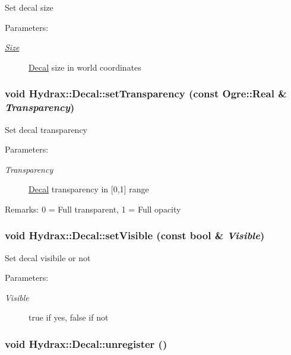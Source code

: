 Set decal size \begin{Desc}
\item[Parameters:]
\begin{description}
\item[{\em \hyperlink{struct_hydrax_1_1_size}{Size}}]\hyperlink{class_hydrax_1_1_decal}{Decal} size in world coordinates \end{description}
\end{Desc}
\hypertarget{class_hydrax_1_1_decal_c1f66263a33a56b806ea08fb05b47951}{
\subsubsection[{setTransparency}]{\setlength{\rightskip}{0pt plus 5cm}void Hydrax::Decal::setTransparency (const Ogre::Real \& {\em Transparency})}}
\label{class_hydrax_1_1_decal_c1f66263a33a56b806ea08fb05b47951}


Set decal transparency \begin{Desc}
\item[Parameters:]
\begin{description}
\item[{\em Transparency}]\hyperlink{class_hydrax_1_1_decal}{Decal} transparency in \mbox{[}0,1\mbox{]} range \end{description}
\end{Desc}
\begin{Desc}
\item[Remarks:]0 = Full transparent, 1 = Full opacity \end{Desc}
\hypertarget{class_hydrax_1_1_decal_5c51a36fc2d8c6f320db291805b8401a}{
\subsubsection[{setVisible}]{\setlength{\rightskip}{0pt plus 5cm}void Hydrax::Decal::setVisible (const bool \& {\em Visible})}}
\label{class_hydrax_1_1_decal_5c51a36fc2d8c6f320db291805b8401a}


Set decal visibile or not \begin{Desc}
\item[Parameters:]
\begin{description}
\item[{\em Visible}]true if yes, false if not \end{description}
\end{Desc}
\hypertarget{class_hydrax_1_1_decal_a517fc153970df9ccabffda04b27892c}{
\subsubsection[{unregister}]{\setlength{\rightskip}{0pt plus 5cm}void Hydrax::Decal::unregister ()}}
\label{class_hydrax_1_1_decal_a517fc153970df9ccabffda04b27892c}


